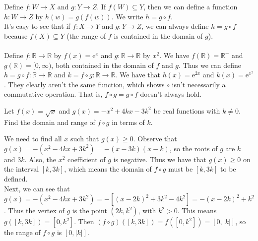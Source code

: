\documentclass[12pt, a4paper, titlepage, twoside]{article}
\newcommand*{\R}{\mathbb{R}}
\newcommand*{\e}{\textrm{e}}
\newcounter{excount}[subsection]
\begin{document}
	\begin{kp}
		Define $f : W \to X$ and $g : Y \to Z$. If $f(W) \subseteq Y$, then we can define a function $h : W \to Z$ by
		$h(w) = g(f(w))$. We write $h = g \circ f$.\\
		
		It's easy to see that if $f : X \to Y$ and $g : Y \to Z$, we can always define $h = g \circ f$ because $f(X) \subseteq Y$ (the range of
		$f$ is contained in the domain of $g$).
	\end{kp}
	
	\paragraph{}
	Define $f : \R \to \R$ by $f(x) = \e^x$ and $g : \R \to \R$ by $x^2$. We have $f(\R) = \R^+$ and $g(\R) = [0,\infty)$, both contained
	in the domain of $f$ and $g$. Thus we can define $h = g \circ f : \R \to \R$ and $k = f \circ g : \R \to \R$. We have that
	$h(x) = \e^{2x}$ and $k(x) = \e^{x^2}$. They clearly aren't the same function, which shows $\circ$ isn't necessarily a commutative operation.
	That is, $f \circ g = g \circ f$ doesn't always hold.\\
	
	\begin{ex}
		Let $f(x) = \sqrt{x}$ and $g(x) = -x^2 + 4kx - 3k^2$ be real functions with $k \neq 0$. Find the domain and range of $f \circ g$ in terms of 
		$k$.
		
		\hfill
		\tcbline
		\hfill
		
		We need to find all $x$ such that $g(x) \geqslant 0$. Observe that $g(x) = -(x^2 - 4kx + 3k^2) = -(x-3k)(x-k)$, so the roots of $g$ are
		$k$ and $3k$. Also, the $x^2$ coefficient of $g$ is negative. Thus we have that $g(x) \geqslant 0$ on the interval $[k, 3k]$, which
		means the domain of $f \circ g$ must be $[k, 3k]$ to be defined.\\
		
		Next, we can see that $g(x) = -(x^2 - 4kx + 3k^2) = -[(x-2k)^2 + 3k^2 - 4k^2] = -(x-2k)^2 + k^2$. Thus the vertex of $g$ is the point
		$(2k, k^2)$, with $k^2 > 0$. This means $g([k, 3k]) = [0,k^2]$. Then $(f \circ g)([k, 3k]) = f([0, k^2]) = [0, |k|]$, so the range of
		$f \circ g$ is $[0, |k|]$.
	\end{ex}
	
\end{document}
